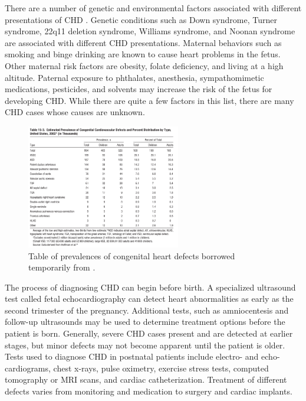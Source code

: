 There are a number of genetic and environmental factors associated with different presentations of CHD \cite{Mozaffarian2016}. Genetic conditions such as Down syndrome, Turner syndrome, 22q11 deletion syndrome, Williams syndrome, and Noonan syndrome are associated with different CHD presentations. Maternal behaviors such as smoking and binge drinking are known to cause heart problems in the fetus. Other maternal risk factors are obesity, folate deficiency, and living at a high altitude. Paternal exposure to phthalates, anesthesia, sympathomimetic medications, pesticides, and solvents may increase the risk of the fetus for developing CHD. While there are quite a few factors in this list, there are many CHD cases whose causes are unknown.

\begin{figure}
\centering
\includegraphics[width=0.6\textwidth]{5/chd-defects-usa.png}
\caption{Table of prevalences of congenital heart defects borrowed temporarily from \cite{Mozaffarian2016}.}
\label{ch5:fig:usa-defects-prev}
\end{figure}

The process of diagnosing CHD can begin before birth. A specialized ultrasound test called fetal echocardiography can detect heart abnormalities as early as the second trimester of the pregnancy. Additional tests, such as amniocentesis and follow-up ultrasounds may be used to determine treatment options before the patient is born. Generally, severe CHD cases present and are detected at earlier stages, but minor defects may not become apparent until the patient is older. Tests used to diagnose CHD in postnatal patients include electro- and echo-cardiograms, chest x-rays, pulse oximetry, exercise stress tests, computed tomography or MRI scans, and cardiac catheterization. Treatment of different defects varies from monitoring and medication to surgery and cardiac implants.

